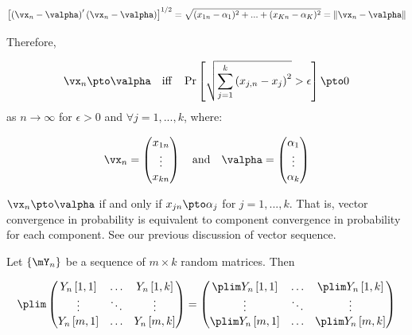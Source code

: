 \documentclass[english,12pt]{book}\usepackage[]{graphicx}\usepackage[]{xcolor}
\begin{document}
\begin{equation*}
\left[\left(\vx_n - \valpha\right)'\left(\vx_n - \valpha\right)\right]^{1/2} = \sqrt{(x_{1n}-\alpha_1)^2 + ... + (x_{Kn} - \alpha_K)^2} = \left\| \vx_n - \valpha\right\| 
\end{equation*}


Therefore, 

\begin{equation*}
\vx_n \pto \valpha\quad \mbox{iff}\quad \Pr\left[\sqrt{\sum_{j = 1}^k\left(x_{j,n}- x_j\right)^2}> \epsilon\right]\pto 0
\end{equation*}
%
as $n\to \infty$ for $\epsilon >0$ and $\forall j = 1,...,k$, where:

\begin{equation*}
\vx_n = \begin{pmatrix}
          x_{1n} \\
          \vdots \\
          x_{kn}
        \end{pmatrix}
        \quad
        \mbox{and}
        \quad
\valpha = \begin{pmatrix}
            \alpha_1 \\
            \vdots \\
            \alpha_{k}
          \end{pmatrix}
\end{equation*}

\begin{remark}
  $\vx_n \pto \valpha$ if and only if $x_{jn}\pto \alpha_j$ for $j =1, ...,k$. That is, vector convergence in probability is equivalent to component convergence in probability for each component. See our previous discussion of vector sequence.
\end{remark}

\begin{definition}[Probability Limits of Matrices (and Vectors for $k = 1$)]
Let $\left\lbrace \mY_n \right\rbrace$ be a sequence of $m\times k$ random matrices. Then

\begin{equation*}
  \plim \begin{pmatrix}
          Y_n\left[1, 1\right] & \hdots & Y_n\left[1, k\right] \\
          \vdots & \ddots & \vdots \\
          Y_n\left[m, 1\right] & \hdots & Y_n\left[m, k\right]
        \end{pmatrix} = \begin{pmatrix}
          \plim Y_n\left[1, 1\right] & \hdots & \plim Y_n\left[1, k\right] \\
          \vdots & \ddots & \vdots \\
          \plim Y_n\left[m, 1\right] & \hdots & \plim Y_n\left[m, k\right]
        \end{pmatrix}
\end{equation*}
\end{definition}
\end{document}
